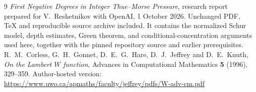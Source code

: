 \documentclass[11pt,a4paper]{article}
\theoremstyle{remark}\newtheorem*{ednote}{Editorial note (ProveIt, 2026-10-01)}
\begin{document}
\begin{thebibliography}{9}
 \emph{First Negative Degrees in Integer Thue--Morse Pressure}, research report prepared for V.~Reshetnikov with OpenAI, 1 October 2026. Unchanged PDF, TeX and reproducible source archive included. It contains the normalized Schur model, depth estimates, Green theorem, and conditional-concentration arguments used here, together with the pinned repository source and earlier prerequisites.
 R.~M.~Corless, G.~H.~Gonnet, D.~E.~G.~Hare, D.~J.~Jeffrey and D.~E.~Knuth, \emph{On the Lambert $W$ function}, Advances in Computational Mathematics \textbf{5} (1996), 329--359. Author-hosted version:\newline
\url{https://www.uwo.ca/apmaths/faculty/jeffrey/pdfs/W-adv-cm.pdf}
\end{thebibliography}
\end{document}
